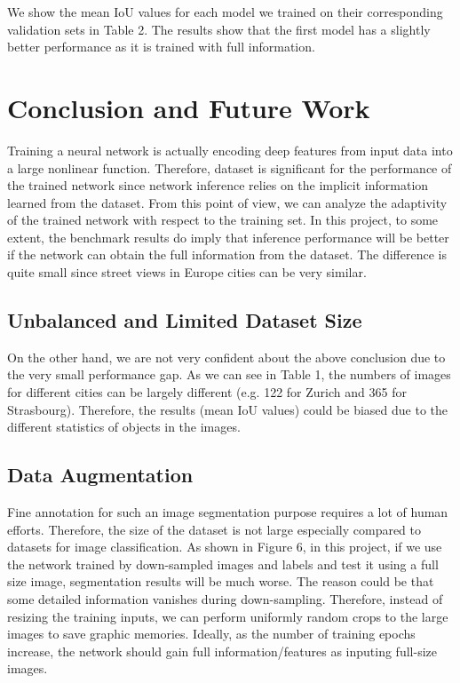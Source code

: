 \documentclass[10pt,twocolumn,letterpaper]{article}
\begin{document}
We show the mean IoU values for each model we trained on their corresponding validation sets in Table 2. The results show that the first model has a slightly better performance as it is trained with full information.

\section{Conclusion and Future Work}
Training a neural network is actually encoding deep features from input data into a large nonlinear function. Therefore, dataset is significant for the performance of the trained network since network inference relies on the implicit information learned from the dataset. From this point of view, we can analyze the adaptivity of the trained network with respect to the training set. In this project, to some extent, the benchmark results do imply that inference performance will be better if the network can obtain the full information from the dataset. The difference is quite small since street views in Europe cities can be very similar.

\subsection{Unbalanced and Limited Dataset Size}
On the other hand, we are not very confident about the above conclusion due to the very small performance gap. As we can see in Table 1, the numbers of images for different cities can be largely different (e.g. 122 for Zurich and 365 for Strasbourg). Therefore, the results (mean IoU values) could be biased due to the different statistics of objects in the images.

\subsection{Data Augmentation}
Fine annotation for such an image segmentation purpose requires a lot of human efforts. Therefore, the size of the dataset is not large especially compared to datasets for image classification. As shown in Figure 6, in this project, if we use the network trained by down-sampled images and labels and test it using a full size image, segmentation results will be much worse. The reason could be that some detailed information vanishes during down-sampling. Therefore, instead of resizing the training inputs, we can perform uniformly random crops to the large images to save graphic memories. Ideally, as the number of training epochs increase, the network should gain full information/features as inputing full-size images.
\end{document}
